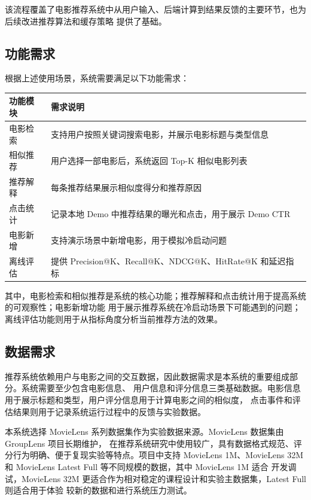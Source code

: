 该流程覆盖了电影推荐系统中从用户输入、后端计算到结果反馈的主要环节，也为后续改进推荐算法和缓存策略
提供了基础。

\subsection{功能需求}

根据上述使用场景，系统需要满足以下功能需求：

\begin{center}
\begin{tabular}{ll}
\toprule
\textbf{功能模块} & \textbf{需求说明} \\
\midrule
电影检索 & 支持用户按照关键词搜索电影，并展示电影标题与类型信息 \\
相似推荐 & 用户选择一部电影后，系统返回 Top-K 相似电影列表 \\
推荐解释 & 每条推荐结果展示相似度得分和推荐原因 \\
点击统计 & 记录本地 Demo 中推荐结果的曝光和点击，用于展示 Demo CTR \\
电影新增 & 支持演示场景中新增电影，用于模拟冷启动问题 \\
离线评估 & 提供 Precision@K、Recall@K、NDCG@K、HitRate@K 和延迟指标 \\
\bottomrule
\end{tabular}
\end{center}

其中，电影检索和相似推荐是系统的核心功能；推荐解释和点击统计用于提高系统的可观察性；电影新增功能
用于展示推荐系统在冷启动场景下可能遇到的问题；离线评估功能则用于从指标角度分析当前推荐方法的效果。

\subsection{数据需求}

推荐系统依赖用户与电影之间的交互数据，因此数据需求是本系统的重要组成部分。系统需要至少包含电影信息、
用户信息和评分信息三类基础数据。电影信息用于展示标题和类型，用户评分信息用于计算电影之间的相似度，
点击事件和评估结果则用于记录系统运行过程中的反馈与实验数据。

本系统选择 MovieLens 系列数据集作为实验数据来源。MovieLens 数据集由 GroupLens 项目长期维护，
在推荐系统研究中使用较广，具有数据格式规范、评分行为明确、便于复现实验等特点。项目中支持
MovieLens 1M、MovieLens 32M 和 MovieLens Latest Full 等不同规模的数据，其中 MovieLens 1M 适合
开发调试，MovieLens 32M 更适合作为相对稳定的课程设计和实验主数据集，Latest Full 则适合用于体验
较新的数据和进行系统压力测试。

